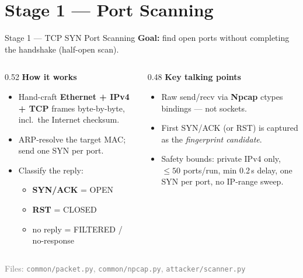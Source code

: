 \documentclass[10pt,aspectratio=169]{beamer}
\newcommand{\kv}[2]{\textbf{#1} \textcolor{gray}{\textrightarrow} #2}
\begin{document}
\section{Stage 1 --- Port Scanning}
\begin{frame}{Stage 1 --- TCP SYN Port Scanning}
  \textbf{Goal:} find open ports without completing the handshake (half-open scan).
  \begin{columns}[T]
    \begin{column}{0.52\textwidth}
      \textbf{How it works}
      \begin{itemize}
        \item Hand-craft \kv{Ethernet + IPv4 + TCP}{} frames byte-by-byte,
              incl.\ the Internet checksum.
        \item ARP-resolve the target MAC; send one \alert{SYN} per port.
        \item Classify the reply:
          \begin{itemize}
            \item \textbf{SYN/ACK} = OPEN
            \item \textbf{RST} = CLOSED
            \item no reply = FILTERED / no-response
          \end{itemize}
      \end{itemize}
    \end{column}
    \begin{column}{0.48\textwidth}
      \textbf{Key talking points}
      \begin{itemize}
        \item Raw send/recv via \textbf{Npcap} ctypes bindings --- not sockets.
        \item First SYN/ACK (or RST) is captured as the \emph{fingerprint candidate}.
        \item \alert{Safety bounds:} private IPv4 only, $\le 50$ ports/run,
              min 0.2\,s delay, one SYN per port, no IP-range sweep.
      \end{itemize}
    \end{column}
  \end{columns}
  \vspace{0.4em}
  \footnotesize\textcolor{gray}{Files: \texttt{common/packet.py}, \texttt{common/npcap.py}, \texttt{attacker/scanner.py}}
\end{frame}

\end{document}
